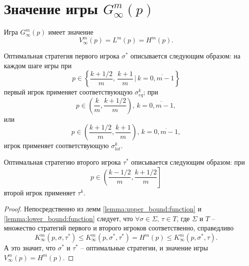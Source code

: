 \section{Значение игры $ G_\infty^m(p) $}
\begin{theorem}
\label{theorem:infinite_game:value}
Игра $ G_\infty^m(p) $ имеет значение 
\[
V_\infty^m(p) = L^m(p) = H^m(p).
\]

Оптимальная стратегия первого игрока $ \sigma^* $ описывается следующим образом: на каждом шаге игры при 
\[
  p \in \left\{
    \frac{k+1/2}{m}, \, \frac{k+1}{m} \,|\, k = \overline{0, m-1}
  \right\}
\]
первый игрок применяет соответствующую $ \sigma^k_{eq} $; при
\[
  p \in \left(
    \frac{k}{m}, \frac{k+1/2}{m}
  \right),\,
  k = \overline{0, m-1},
\]
или
\[
  p \in \left(
    \frac{k+1/2}{m}, \frac{k+1}{m}
  \right),\,
  k = \overline{0, m-1},
\]
игрок применяет соответствующую $ \sigma^k_{lot} $.

Оптимальная стратегию второго игрока $ \tau^* $ описывается следующим образом: при
\[
  p \in \left(
    \frac{k-1/2}{m}, \frac{k+1/2}{m}
  \right]
\]
второй игрок применяет $ \tau^k $.
\end{theorem}
\begin{proof}
Непосредственно из лемм \ref{lemma:upper_bound:function} и \ref{lemma:lower_bound:function} следует, что
$ \forall \sigma \in \Sigma, \, \tau \in T $, где $ \Sigma $ и $ T $ -- множество стратегий первого и второго игроков соответственно, справедливо
\[
  K_\infty^m(p, \sigma, \tau^*)
\leq K_\infty^m(p, \sigma^*, \tau^*) = H^m(p) \leq 
  K_\infty^m(p, \sigma^*, \tau).
\]
А это значит, что $ \sigma^* $ и $ \tau^* $ -- оптимальные стратегии, и значение игры $ V_\infty^m(p) = H^m(p) $.
\end{proof}
